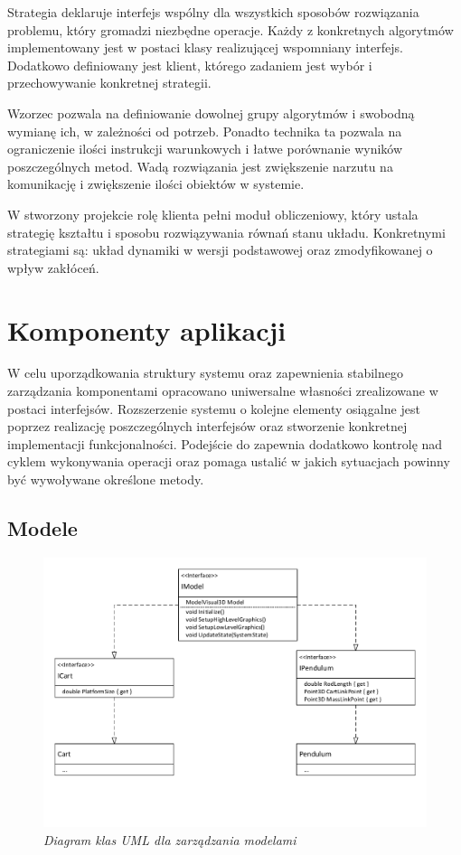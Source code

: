 \documentclass[12pt, oneside]{report}
\theoremstyle{definition}
\begin{document}
Strategia deklaruje interfejs wspólny dla wszystkich sposobów rozwiązania problemu, który gromadzi niezbędne operacje. Każdy z konkretnych algorytmów implementowany jest w postaci klasy realizującej wspomniany interfejs. Dodatkowo definiowany jest klient, którego zadaniem jest wybór i przechowywanie konkretnej strategii. 

Wzorzec pozwala na definiowanie dowolnej grupy algorytmów i swobodną wymianę ich, w zależności od potrzeb. Ponadto technika ta pozwala na ograniczenie ilości instrukcji warunkowych i łatwe porównanie wyników poszczególnych metod. Wadą rozwiązania jest zwiększenie narzutu na komunikację i zwiększenie ilości obiektów w systemie.

W stworzony projekcie rolę klienta pełni moduł obliczeniowy, który ustala strategię kształtu i sposobu rozwiązywania równań stanu układu. Konkretnymi strategiami są: układ dynamiki w wersji podstawowej oraz zmodyfikowanej o wpływ zakłóceń. 

\section{Komponenty aplikacji}
W celu uporządkowania struktury systemu oraz zapewnienia stabilnego zarządzania komponentami opracowano uniwersalne własności zrealizowane w postaci interfejsów. Rozszerzenie systemu o kolejne elementy osiągalne jest poprzez realizację poszczególnych interfejsów oraz stworzenie konkretnej implementacji funkcjonalności. Podejście do zapewnia dodatkowo kontrolę nad cyklem wykonywania operacji oraz pomaga ustalić w jakich sytuacjach powinny być wywoływane określone metody.
\subsection{Modele}

\begin{figure}[H]
	\centering
		\includegraphics[width = 400pt]{IModel} 
		\caption{\textit{Diagram klas UML dla zarządzania modelami}}
		\label{IModel}
\end{figure}
\end{document}
